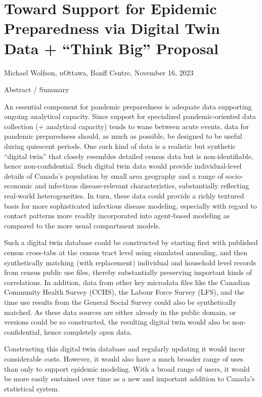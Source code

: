 \section{Toward Support for Epidemic Preparedness via Digital Twin Data
+ ``Think Big''
Proposal}\label{toward-support-for-epidemic-preparedness-via-digital-twin-data-think-big-proposal}

Michael Wolfson, uOttawa, Banff Centre, November 16, 2023

Abstract / Summary

An essential component for pandemic preparedness is adequate data
supporting ongoing analytical capacity. Since support for specialized
pandemic-oriented data collection (+ analytical capacity) tends to wane
between acute events, data for pandemic preparedness should, as much as
possible, be designed to be useful during quiescent periods. One such
kind of data is a realistic but synthetic ``digital twin'' that closely
resembles detailed census data but is non-identifiable, hence
non-confidential. Such digital twin data would provide individual-level
details of Canada's population by small area geography and a range of
socio-economic and infectious disease-relevant characteristics,
substantially reflecting real-world heterogeneities. In turn, these data
could provide a richly textured basis for more sophisticated infectious
disease modeling, especially with regard to contact patterns more
readily incorporated into agent-based modeling as compared to the more
usual compartment models.

Such a digital twin database could be constructed by starting first with
published census cross-tabs at the census tract level using simulated
annealing, and then synthetically matching (with replacement) individual
and household level records from census public use files, thereby
substantially preserving important kinds of correlations. In addition,
data from other key microdata files like the Canadian Community Health
Survey (CCHS), the Labour Force Survey (LFS), and the time use results
from the General Social Survey could also be synthetically matched. As
these data sources are either already in the public domain, or versions
could be so constructed, the resulting digital twin would also be
non-confidential, hence completely open data.

Constructing this digital twin database and regularly updating it would
incur considerable costs. However, it would also have a much broader
range of uses than only to support epidemic modeling. With a broad range
of users, it would be more easily sustained over time as a new and
important addition to Canada's statistical system.

